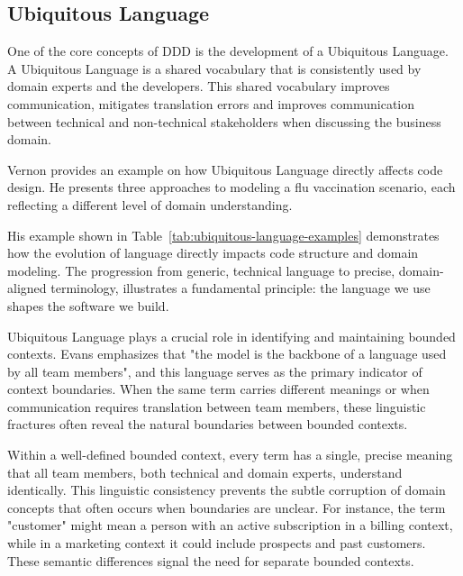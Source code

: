 \subsection{Ubiquitous Language}
One of the core concepts of DDD is the development of a Ubiquitous Language. A Ubiquitous Language is a shared vocabulary that is consistently used by domain experts and the developers. This shared vocabulary improves communication, mitigates translation errors and improves communication between technical and non-technical stakeholders when discussing the business domain.

Vernon \autocite[p.~22]{vernon2013implementing} provides an example on how Ubiquitous Language directly affects code design. He presents three approaches to modeling a flu vaccination scenario, each reflecting a different level of domain understanding.

His example shown in Table~\ref{tab:ubiquitous-language-examples} demonstrates how the evolution of language directly impacts code structure and domain modeling. The progression from generic, technical language to precise, domain-aligned terminology, illustrates a fundamental principle: the language we use shapes the software we build.

Ubiquitous Language plays a crucial role in identifying and maintaining bounded contexts. Evans \autocite[p.~13]{Evans2003} emphasizes that "the model is the backbone of a language used by all team members", and this language serves as the primary indicator of context boundaries. When the same term carries different meanings or when communication requires translation between team members, these linguistic fractures often reveal the natural boundaries between bounded contexts.

Within a well-defined bounded context, every term has a single, precise meaning that all team members, both technical and domain experts, understand identically. This linguistic consistency prevents the subtle corruption of domain concepts that often occurs when boundaries are unclear. For instance, the term "customer" might mean a person with an active subscription in a billing context, while in a marketing context it could include prospects and past customers. These semantic differences signal the need for separate bounded contexts.

